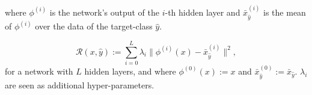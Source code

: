where $\phi^{(i)}$ is the network's output of the $i$-th hidden layer and $\bar x_{\hat y}^{(i)}$ is the mean of $\phi^{(i)}$ over the data of the target-class $\hat y$.

$$\mathcal R(x,\hat y) := 
\sum_{i=0}^L \lambda_i \|\phi^{(i)} (x)-\bar x_{\hat y}^{(i)}\|^2
\comma$$
for a network with $L$ hidden layers, and where $\phi^{(0)}(x) := x$ and $\bar x_{\hat y}^{(0)} := \bar x_{\hat y}$.
$\lambda_i$ are seen as additional hyper-parameters.

%
%
%
%
%
%
